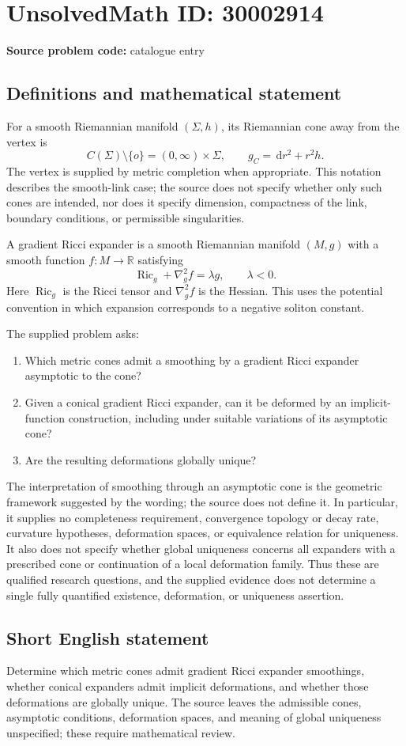 \documentclass[11pt]{article}
\newcommand{\R}{\mathbb{R}}
\newcommand{\dd}{\,\mathrm{d}}
\begin{document}
\section*{UnsolvedMath ID: 30002914}
\textbf{Source problem code:} catalogue entry
\subsection{Definitions and mathematical statement}
For a smooth Riemannian manifold \((\Sigma,h)\), its Riemannian cone away from the vertex is
\[
C(\Sigma)\setminus\{o\}=(0,\infty)\times\Sigma,
\qquad g_C=\dd r^2+r^2h.
\]
The vertex is supplied by metric completion when appropriate. This notation describes the smooth-link case; the source does not specify whether only such cones are intended, nor does it specify dimension, compactness of the link, boundary conditions, or permissible singularities.

A gradient Ricci expander is a smooth Riemannian manifold \((M,g)\) with a smooth function \(f\colon M\to\R\) satisfying
\[
\operatorname{Ric}_g+\nabla_g^2f=\lambda g,
\qquad \lambda<0.
\]
Here \(\operatorname{Ric}_g\) is the Ricci tensor and \(\nabla_g^2f\) is the Hessian. This uses the potential convention in which expansion corresponds to a negative soliton constant.

The supplied problem asks:
\begin{enumerate}
\item Which metric cones admit a smoothing by a gradient Ricci expander asymptotic to the cone?
\item Given a conical gradient Ricci expander, can it be deformed by an implicit-function construction, including under suitable variations of its asymptotic cone?
\item Are the resulting deformations globally unique?
\end{enumerate}
The interpretation of smoothing through an asymptotic cone is the geometric framework suggested by the wording; the source does not define it. In particular, it supplies no completeness requirement, convergence topology or decay rate, curvature hypotheses, deformation spaces, or equivalence relation for uniqueness. It also does not specify whether global uniqueness concerns all expanders with a prescribed cone or continuation of a local deformation family. Thus these are qualified research questions, and the supplied evidence does not determine a single fully quantified existence, deformation, or uniqueness assertion.
\subsection{Short English statement}
Determine which metric cones admit gradient Ricci expander smoothings, whether conical expanders admit implicit deformations, and whether those deformations are globally unique. The source leaves the admissible cones, asymptotic conditions, deformation spaces, and meaning of global uniqueness unspecified; these require mathematical review.
\end{document}
